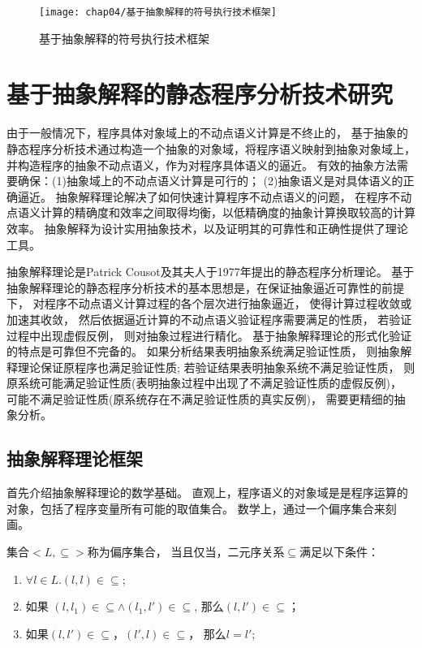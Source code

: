 \begin{figure}[h]
	\centering
	\texttt{[image: chap04/基于抽象解释的符号执行技术框架]}
	\caption{基于抽象解释的符号执行技术框架}
	\label{fig-framework}
\end{figure}




\section{基于抽象解释的静态程序分析技术研究}
\label{sec-absint}

由于一般情况下，程序具体对象域上的不动点语义计算是不终止的，
基于抽象的静态程序分析技术通过构造一个抽象的对象域，将程序语义映射到抽象对象域上，
并构造程序的抽象不动点语义，作为对程序具体语义的逼近。
有效的抽象方法需要确保：(1)抽象域上的不动点语义计算是可行的；
(2)抽象语义是对具体语义的正确逼近。
抽象解释理论解决了如何快速计算程序不动点语义的问题，
在程序不动点语义计算的精确度和效率之间取得均衡，以低精确度的抽象计算换取较高的计算效率。
抽象解释为设计实用抽象技术，以及证明其的可靠性和正确性提供了理论工具。

抽象解释理论是Patrick Cousot及其夫人于1977年提出的静态程序分析理论。
基于抽象解释理论的静态程序分析技术的基本思想是，在保证抽象逼近可靠性的前提下，
对程序不动点语义计算过程的各个层次进行抽象逼近， 使得计算过程收敛或加速其收敛，
然后依据逼近计算的不动点语义验证程序需要满足的性质，
若验证过程中出现虚假反例， 则对抽象过程进行精化。
基于抽象解释理论的形式化验证的特点是可靠但不完备的。
如果分析结果表明抽象系统满足验证性质， 则抽象解释理论保证原程序也满足验证性质;
若验证结果表明抽象系统不满足验证性质，
则原系统可能满足验证性质(表明抽象过程中出现了不满足验证性质的虚假反例)，
可能不满足验证性质(原系统存在不满足验证性质的真实反例)， 需要更精细的抽象分析。



\subsection{抽象解释理论框架}

首先介绍抽象解释理论的数学基础。
直观上，程序语义的对象域是是程序运算的对象，包括了程序变量所有可能的取值集合。
数学上，通过一个偏序集合来刻画。

\begin{definition}
集合$<L, \subseteq>$称为偏序集合，
当且仅当，二元序关系$\subseteq$满足以下条件：
\begin{enumerate}
\item $\forall l \in L. (l,l)\in \subseteq$;
\item 如果 $(l,l_1)\in \subseteq \wedge (l_1, l')\in \subseteq$,
	那么$(l,l')\in \subseteq$；
\item 如果$(l,l')\in \subseteq$，$(l',l)\in \subseteq$，
	那么$l = l'$;
\end{enumerate}
\end{definition}


